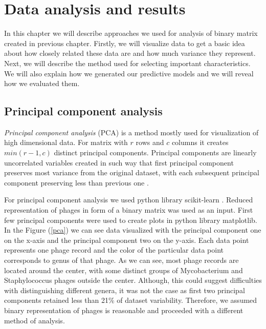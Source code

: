 \chapter{Data analysis and results}
In this chapter we will describe approaches we used for analysis of binary matrix created in previous chapter.
Firstly, we will visualize data to get a basic idea about how closely related these data are and how much variance they represent.
Next, we will describe the method used for selecting important characteristics.
We will also explain how we generated our predictive models and we will reveal how we evaluated them.

\section{Principal component analysis}
\emph{Principal component analysis} (PCA) is a method mostly used for visualization of high dimensional data.
For matrix with $r$ rows and $c$ columns it creates $min(r-1, c)$ distinct principal components.
Principal components are linearly uncorrelated variables created in such way that first principal component preserves most variance from the original dataset, with each subsequent principal component preserving less than previous one \cite{principal}.

For principal component analysis we used python library scikit-learn \cite{sklearn}.
Reduced representation of phages in form of a binary matrix was used as an input.
First few principal components were used to create plots in python library matplotlib.
In the Figure (\ref{pca}) we can see data visualized with the principal component one on the x-axis and the principal component two on the y-axis.
Each data point represents one phage record and the color of the particular data point corresponds to genus of that phage.
As we can see, most phage records are located around the center, with some distinct groups of Mycobacterium and Staphylococcus phages outside the center.
Although, this could suggest difficulties with distinguishing different genera, it was not the case as first two principal components retained less than 21\% of dataset variability.
Therefore, we assumed binary representation of phages is reasonable and proceeded with a different method of analysis.


